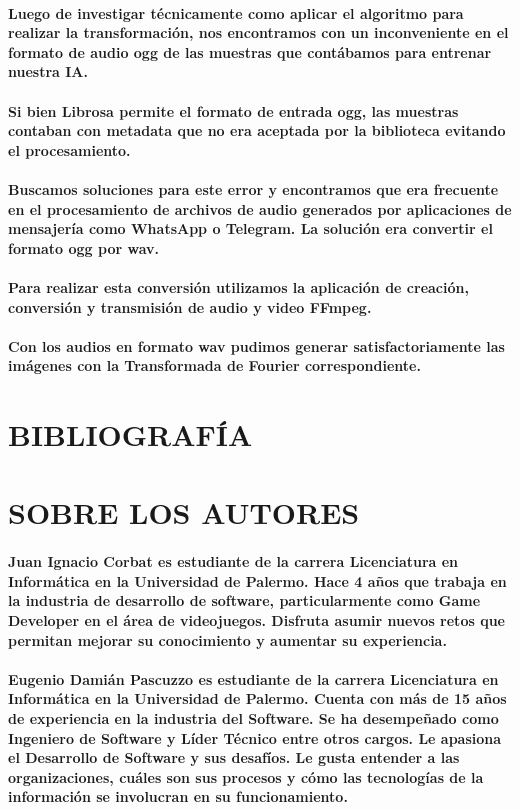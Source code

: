 \documentclass[a4paper,11pt,twocolumn]{article}
\begin{document}
\paragraph{Luego de investigar técnicamente como aplicar el algoritmo para realizar la transformación, nos encontramos con un inconveniente en el formato de audio ogg de las muestras que contábamos para entrenar nuestra IA.}
\paragraph{Si bien Librosa permite el formato de entrada ogg, las muestras contaban con metadata que no era aceptada por la biblioteca evitando el procesamiento.}
\paragraph{Buscamos soluciones para este error y encontramos que era frecuente en el procesamiento de archivos de audio generados por aplicaciones de mensajería como WhatsApp o Telegram. La solución era convertir el formato ogg por wav.}
\paragraph{Para realizar esta conversión utilizamos la aplicación de creación, conversión y transmisión de audio y video FFmpeg.}
\paragraph{Con los audios en formato wav pudimos generar satisfactoriamente las imágenes con la Transformada de Fourier correspondiente.}
\section{BIBLIOGRAFÍA}
\printbibliography[heading=none]
\section{SOBRE LOS AUTORES}
\paragraph{Juan Ignacio Corbat es estudiante de la carrera Licenciatura en Informática en la Universidad de Palermo. Hace 4 años que trabaja en la industria de desarrollo de software, particularmente como Game Developer en el área de videojuegos. Disfruta asumir nuevos retos que permitan mejorar su conocimiento y aumentar su experiencia.}
\paragraph{Eugenio Damián Pascuzzo es estudiante de la carrera Licenciatura en Informática en la Universidad de Palermo. Cuenta con más de 15 años de experiencia en la industria del Software. Se ha desempeñado como Ingeniero de Software y Líder Técnico entre otros cargos. Le apasiona el Desarrollo de Software y sus desafíos. Le gusta entender a las organizaciones, cuáles son sus procesos y cómo las tecnologías de la información se involucran en su funcionamiento.}
\end{document}
